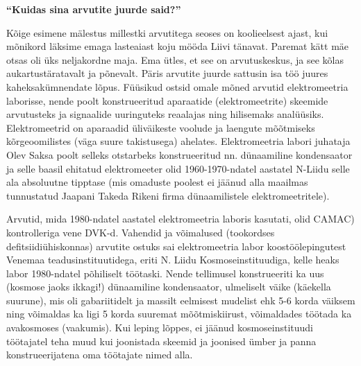 
\textbf{\enquote{Kuidas sina arvutite juurde said?}}

Kõige esimene mälestus millestki arvutitega seoses on koolieelsest ajast, kui
mõnikord läksime emaga lasteaiast koju mööda Liivi tänavat. Paremat kätt mäe
otsas oli üks neljakordne maja. Ema ütles, et see on arvutuskeskus, ja see
kõlas aukartustäratavalt ja põnevalt.  Päris arvutite juurde sattusin isa töö
juures kaheksakümnendate lõpus. Füüsikud ostsid omale mõned arvutid
elektromeetria laborisse, nende poolt konstrueeritud aparaatide
(elektromeetrite) skeemide arvutusteks ja signaalide uuringuteks reaalajas ning
hilisemaks analüüsiks. Elektromeetrid on aparaadid üliväikeste voolude ja
laengute mõõtmiseks kõrgeoomilistes (väga suure takistusega) ahelates.
Elektromeetria labori juhataja Olev Saksa poolt selleks
otstarbeks konstrueeritud nn. dünaamiline kondensaator ja selle baasil ehitatud
elektromeeter olid 1960-1970-ndatel aastatel N-Liidu selle ala absoluutne
tipptase (mis omaduste poolest ei jäänud alla maailmas tunnustatud Jaapani
Takeda Rikeni firma dünaamilistele elektromeetritele).

Arvutid, mida 1980-ndatel aastatel elektromeetria laboris kasutati, olid
CAMAC) kontrolleriga vene
DVK-d.
Vahendid ja võimalused (tookordses defitsiidiühiskonnas) arvutite ostuks sai
elektromeetria labor koostöölepingutest Venemaa teadusinstituutidega, eriti N.
Liidu Kosmoseinstituudiga, kelle heaks labor 1980-ndatel põhiliselt töötaski.
Nende tellimusel konstrueeriti ka uus (kosmose jaoks ikkagi!) dünaamiline
kondensaator, ulmeliselt väike (käekella suurune), mis oli gabariitidelt ja
massilt eelmisest mudelist ehk 5-6 korda väiksem ning võimaldas ka ligi 5 korda
suuremat mõõtmiskiirust, võimaldades töötada ka avakosmoses (vaakumis). Kui
leping lõppes, ei jäänud kosmoseinstituudi töötajatel teha muud kui joonistada
skeemid ja joonised ümber ja panna konstrueerijatena oma töötajate nimed alla.

